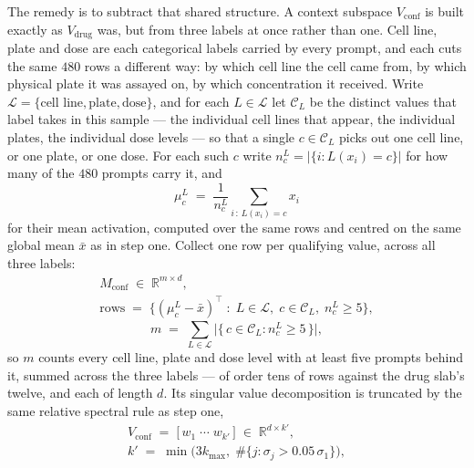 The remedy is to subtract that shared structure. A context subspace
$V_{\textrm{conf}}$ is built exactly as $V_{\textrm{drug}}$ was, but from three
labels at once rather than one. Cell line, plate and dose are each categorical
labels carried by every prompt, and each cuts the same $\num{480}$ rows a
different way: by which cell line the cell came from, by which physical plate
it was assayed on, by which concentration it received. Write
$\mathcal{L} = \{\textrm{cell line}, \textrm{plate}, \textrm{dose}\}$, and for
each $L \in \mathcal{L}$ let $\mathcal{C}_L$ be the distinct values that label
takes in this sample --- the individual cell lines that appear, the individual
plates, the individual dose levels --- so that a single $c \in \mathcal{C}_L$
picks out one cell line, or one plate, or one dose. For each such $c$ write
$n^{L}_{c} = |\{ i : L(x_i) = c \}|$ for how many of the $\num{480}$ prompts
carry it, and
\begin{equation}
  \mu^{L}_{c} \;=\; \frac{1}{n^{L}_{c}} \sum_{i \,:\, L(x_i) = c} x_i
\end{equation}
for their mean activation, computed over the same rows and centred on the same
global mean $\bar{x}$ as in step one. Collect one row per qualifying value,
across all three labels:
\begin{equation}
\begin{gathered}
  M_{\textrm{conf}} \;\in\; \mathbb{R}^{m \times d},
  \\
  \textrm{rows} \;=\; \big\{ (\mu^{L}_{c} - \bar{x})^{\top} \;:\;
    L \in \mathcal{L},\; c \in \mathcal{C}_L,\; n^{L}_{c} \geq 5 \big\},
\end{gathered}
\end{equation}
\begin{equation}
  m \;=\; \sum_{L \in \mathcal{L}}
          \big| \{\, c \in \mathcal{C}_L : n^{L}_{c} \geq 5 \,\} \big| ,
\end{equation}
so $m$ counts every cell line, plate and dose level with at least five prompts
behind it, summed across the three labels --- of order tens of rows against the
drug slab's twelve, and each of length $d$. Its singular value decomposition is
truncated by the same relative spectral rule as step one,
\begin{equation}
\begin{gathered}
  V_{\textrm{conf}} \;=\; \big[\, w_1 \;\cdots\; w_{k'} \,\big]
  \;\in\; \mathbb{R}^{d \times k'},
  \\
  k' \;=\; \min\!\big( 3k_{\max},\;
           \#\{ j : \sigma_j > 0.05\,\sigma_1 \} \big),
\end{gathered}
\end{equation}
